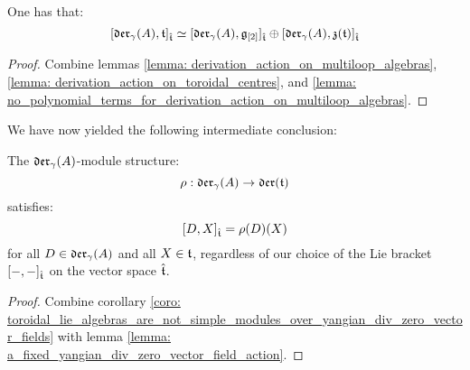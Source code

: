         \begin{corollary} \label{coro: toroidal_lie_algebras_are_not_simple_modules_over_yangian_div_zero_vector_fields}
            One has that:
                $$[\mathfrak{der}_{\gamma}(A), \mathfrak{t}]_{\hat{\mathfrak{t}}} \simeq [\mathfrak{der}_{\gamma}(A), \mathfrak{g}_{[2]}]_{\hat{\mathfrak{t}}} \oplus [\mathfrak{der}_{\gamma}(A), \mathfrak{z}(\mathfrak{t})]_{\hat{\mathfrak{t}}}$$
        \end{corollary}
            \begin{proof}
                Combine lemmas \ref{lemma: derivation_action_on_multiloop_algebras}, \ref{lemma: derivation_action_on_toroidal_centres}, and \ref{lemma: no_polynomial_terms_for_derivation_action_on_multiloop_algebras}.
            \end{proof}

        We have now yielded the following intermediate conclusion:
        \begin{proposition} \label{prop: toroidal_lie_algebras_as_modules_over_div_zero_vector_field_lie_algebras}
            The $\mathfrak{der}_{\gamma}(A)$-module structure:
                $$\rho: \mathfrak{der}_{\gamma}(A) \to \mathfrak{der}(\mathfrak{t})$$
            satisfies:
                $$[D, X]_{\hat{\mathfrak{t}}} = \rho(D)(X)$$
            for all $D \in \mathfrak{der}_{\gamma}(A)$ and all $X \in \mathfrak{t}$, regardless of our choice of the Lie bracket $[-, -]_{\hat{\mathfrak{t}}}$ on the vector space $\hat{\mathfrak{t}}$.
        \end{proposition}
            \begin{proof}
                Combine corollary \ref{coro: toroidal_lie_algebras_are_not_simple_modules_over_yangian_div_zero_vector_fields} with lemma \ref{lemma: a_fixed_yangian_div_zero_vector_field_action}.
            \end{proof}
            
